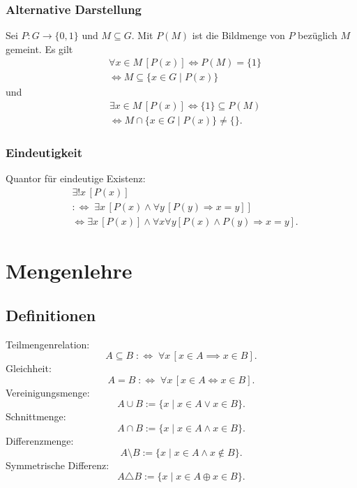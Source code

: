 \subsubsection{Alternative Darstellung}
Sei $P\colon G\to\{0,1\}$ und $M\subseteq G$.
Mit $P(M)$ ist die Bildmenge von $P$ bezüglich $M$ gemeint.
Es gilt
\begin{equation}
\begin{split}
&\forall x{\in}M\,[P(x)] \iff P(M)=\{1\}\\
& \iff M\subseteq\{x{\in}G\mid P(x)\}
\end{split}
\end{equation}
und
\begin{equation}
\begin{split}
& \exists x{\in}M\,[P(x)] \iff \{1\}\subseteq P(M)\\
& \iff M\cap\{x{\in}G\mid P(x)\}\ne\{\}.
\end{split}
\end{equation}

\subsubsection{Eindeutigkeit}
Quantor für eindeutige Existenz:
\begin{equation}
\begin{split}
&\exists!x\,[P(x)]\\
&:\Longleftrightarrow\; \exists x\,[P(x)\land \forall y\,[P(y)\Rightarrow x=y]]\\
&\iff \exists x\,[P(x)]\land \forall x\forall y[P(x)\land P(y)\Rightarrow x=y].
\end{split}
\end{equation}



\section{Mengenlehre}
\subsection{Definitionen}
Teilmengenrelation:
\begin{equation}
A\subseteq B\;:\Longleftrightarrow\; \forall x\,[x\in A\implies x\in B].
\end{equation}
Gleichheit:
\begin{equation}
A=B\;:\Longleftrightarrow\; \forall x\,[x\in A\iff x\in B].
\end{equation}
Vereinigungsmenge:
\begin{equation}
A\cup B:=\{x\mid x\in A\lor x\in B\}.
\end{equation}
Schnittmenge:
\begin{equation}
A\cap B:=\{x\mid x\in A\land x\in B\}.
\end{equation}
Differenzmenge:
\begin{equation}
A\setminus B:=\{x\mid x\in A\land x\not\in B\}.
\end{equation}
Symmetrische Differenz:
\begin{equation}
A\triangle B:=\{x\mid x\in A\oplus x\in B\}.
\end{equation}

